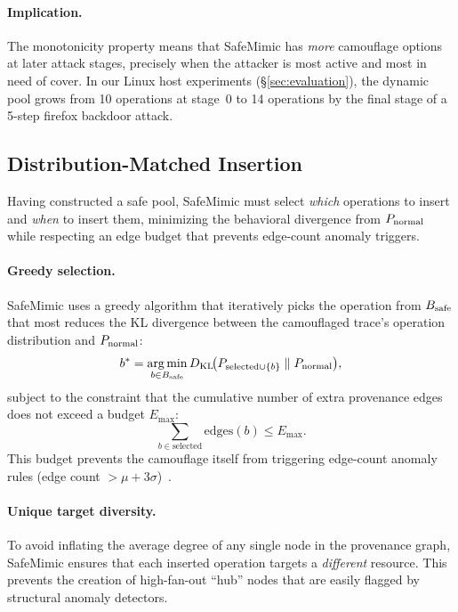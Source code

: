 \paragraph{Implication.}
The monotonicity property means that SafeMimic has \emph{more}
camouflage options at later attack stages, precisely when the attacker is
most active and most in need of cover. In our Linux host experiments
(\S\ref{sec:evaluation}), the dynamic pool grows from 10 operations at
stage~0 to 14 operations by the final stage of a 5-step firefox backdoor
attack.

\subsection{Distribution-Matched Insertion}
\label{sec:distribution}

Having constructed a safe pool, SafeMimic must select \emph{which}
operations to insert and \emph{when} to insert them, minimizing the
behavioral divergence from $P_{\text{normal}}$ while respecting an edge budget
that prevents edge-count anomaly triggers.

\paragraph{Greedy selection.}
SafeMimic uses a greedy algorithm that iteratively picks the operation
from $B_{\text{safe}}$ that most reduces the KL divergence between the
camouflaged trace's operation distribution and $P_{\text{normal}}$:
\begin{equation}
  b^{*} = \operatorname*{arg\,min}_{b \in B_{\text{safe}}}
           D_{\text{KL}}\!\bigl(P_{\text{selected} \cup \{b\}} \;\|\; P_{\text{normal}}\bigr),
  \label{eq:greedy}
\end{equation}
subject to the constraint that the cumulative number of extra provenance
edges does not exceed a budget $E_{\max}$:
\begin{equation}
  \sum_{b \in \text{selected}} \mathrm{edges}(b) \leq E_{\max}.
  \label{eq:budget}
\end{equation}
This budget prevents the camouflage itself from triggering edge-count
anomaly rules (edge count $> \mu + 3\sigma$)~\cite{unicorn,shadewatcher}.

\paragraph{Unique target diversity.}
To avoid inflating the average degree of any single node in the
provenance graph, SafeMimic ensures that each inserted operation targets
a \emph{different} resource. This prevents the creation of
high-fan-out ``hub'' nodes that are easily flagged by structural anomaly
detectors.

